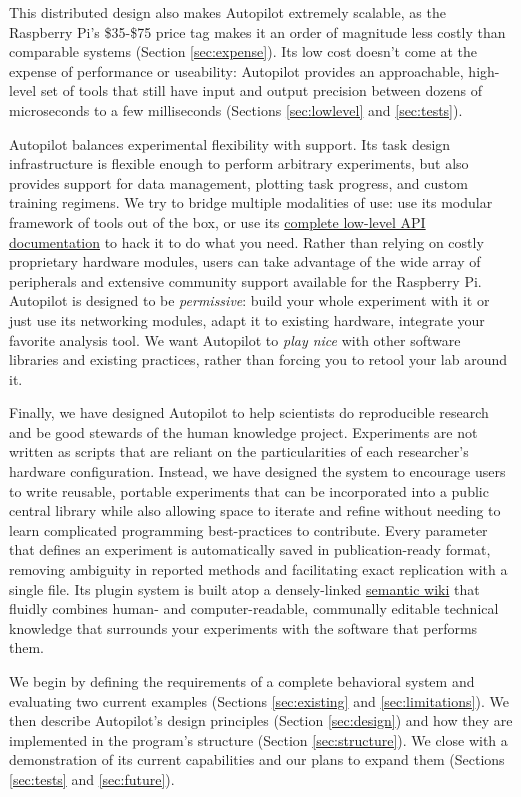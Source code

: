 This distributed design also makes Autopilot extremely scalable, as the Raspberry Pi's \$35-\$75 price tag makes it an order of magnitude less costly than comparable systems (Section \ref{sec:expense}). Its low cost doesn't come at the expense of performance or useability: Autopilot provides an approachable, high-level set of tools that still have input and output precision between dozens of microseconds to a few milliseconds (Sections \ref{sec:lowlevel} and \ref{sec:tests}).

Autopilot balances experimental flexibility with support. Its task design infrastructure is flexible enough to perform arbitrary experiments, but also provides support for data management, plotting task progress, and custom training regimens. We try to bridge multiple modalities of use: use its modular framework of tools out of the box, or use its \href{https://docs.auto-pi-lot.com}{complete low-level API documentation} to hack it to do what you need. Rather than relying on costly proprietary hardware modules, users can take advantage of the wide array of peripherals and extensive community support available for the Raspberry Pi. Autopilot is designed to be \textit{permissive}: build your whole experiment with it or just use its networking modules, adapt it to existing hardware, integrate your favorite analysis tool. We want Autopilot to \textit{play nice} with other software libraries and existing practices, rather than forcing you to retool your lab around it.

Finally, we have designed Autopilot to help scientists do reproducible research and be good stewards of the human knowledge project. Experiments are not written as scripts that are reliant on the particularities of each researcher's hardware configuration. Instead, we have designed the system to encourage users to write reusable, portable experiments that can be incorporated into a public central library while also allowing space to iterate and refine without needing to learn complicated programming best-practices to contribute. Every parameter that defines an experiment is automatically saved in  publication-ready format, removing ambiguity in reported methods and facilitating exact replication with a single file. Its plugin system is built atop a densely-linked \href{https://wiki-auto-pi-lot.com}{semantic wiki} that fluidly combines human- and computer-readable, communally editable technical knowledge that surrounds your experiments with the software that performs them.

\vspace{12pt}

We begin by defining the requirements of a complete behavioral system and evaluating two current examples (Sections \ref{sec:existing} and \ref{sec:limitations}). We then describe Autopilot's design principles (Section \ref{sec:design}) and how they are implemented in the program's structure (Section \ref{sec:structure}). We close with a demonstration of its current capabilities and our plans to expand them (Sections \ref{sec:tests} and \ref{sec:future}).
